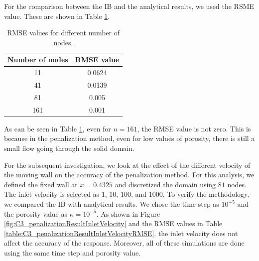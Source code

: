 For the comparison between the IB and the analytical results, we used the RSME value. These are shown in Table \ref{table:C3_penalizationResultNodeNumberRMSE}.

\begin{table}[H]
\centering
\begin{tabular}{c | c}
    Number of nodes & RMSE value \\ \hline \hline
    11 & 0.0624 \\ \hline
    41 & 0.0139 \\ \hline
    81 & 0.005 \\ \hline
    161 & 0.001
\end{tabular}
\caption{RMSE values for different number of nodes.}
\label{table:C3_penalizationResultNodeNumberRMSE}
\end{table}

As can be seen in Table \ref{table:C3_penalizationResultNodeNumberRMSE}, even for $n = 161$, the RMSE value is not zero. This is because in the penalization method, even for low values of porosity, there is still a small flow going through the solid domain.

For the subsequent investigation, we look at the effect of the different velocity of the moving wall on the accuracy of the penalization method. For this analysis, we defined the fixed wall at $x=0.4325$ and discretized the domain using $81$ nodes. The inlet velocity is selected as $1$, $10$, $100$, and $1000$. To verify the methodology, we compared the IB with analytical results. We chose the time step as $10^{-5}$ and the porosity value as $\kappa = 10^{-5}$. As shown in Figure \ref{fig:C3_penalizationResultInletVelocity} and the RMSE values in Table \ref{table:C3_penalizationResultInletVelocityRMSE}, the inlet velocity does not affect the accuracy of the response. Moreover, all of these simulations are done using the same time step and porosity value.

